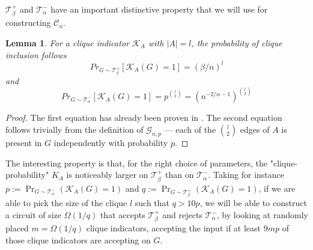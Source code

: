 \documentclass[10pt,a4paper]{article}
\newtheorem{lemma}[theorem]{Lemma}
\begin{document}

$\mathcal{T}^+_\beta$ and $\mathcal{T}^-_\alpha$ have an important distinctive property that we will use for constructing $\mathcal{C}_n$.
\begin{lemma}
\label{lem:positive-and-negative-prob}
    For a clique indicator $\mathcal{K}_A$ with $|A| = l$, the probability of clique inclusion follows
    $$Pr_{G \sim \mathcal{T}^+_\beta}[\mathcal{K}_A(G) = 1] = (\beta/n)^l$$
    and 
    $$Pr_{G \sim \mathcal{T}^-_\alpha}[\mathcal{K}_A(G) = 1] = p^{\binom{l}{2}} = (n^{-2/\alpha - 1})^{\binom{l}{2}}$$
\end{lemma}
\begin{proof}
The first equation has already been proven in . The second equation follows trivially from the definition of $\mathcal{G}_{n, p}$ --- each of the $\binom{l}{2}$ edges of $A$ is present in $G$ independently with probability $p$.
\end{proof}

The interesting property is that, for the right choice of parameters, the "clique-probability" $K_A$ is noticeably larger on $\mathcal{T}^+_\beta$ than on $\mathcal{T}^-_\alpha$. Taking for instance $p := \Pr_{G\sim\mathcal{T}_\alpha^-}(\mathcal{K}_A(G) = 1)$ and $q :=\Pr_{G\sim\mathcal{T}_\beta^+}(\mathcal{K}_A(G) = 1)$, if we are able to pick the size of the clique $l$ such that $q > 10p$, we will be able to construct a circuit of size $\Omega(1/q)$ that accepts $\mathcal{T}^+_\beta$ and rejects $\mathcal{T}^-_\alpha$, by looking at randomly placed $m = \Omega(1/q)$ clique indicators, accepting the input if at least $9 m p $ of those clique indicators are accepting on $G$.

\end{document}
